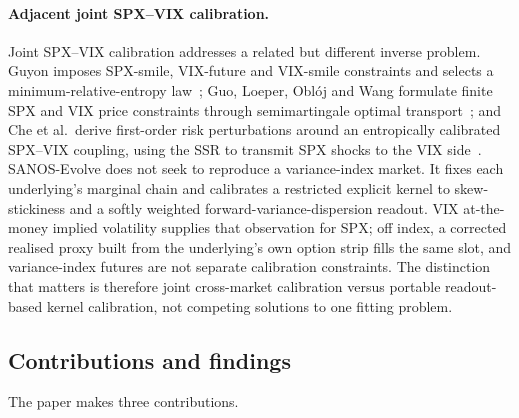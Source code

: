 \documentclass[11pt]{article}
\providecommand{\1}{\mathbf 1}
\begin{document}
\paragraph{Adjacent joint SPX--VIX calibration.} Joint SPX--VIX calibration addresses a related but
different inverse problem. Guyon imposes SPX-smile, VIX-future and VIX-smile constraints and selects
a minimum-relative-entropy law~\cite{guyon2024fs,guyon2025siam}; Guo, Loeper, Obl\'oj and Wang
formulate finite SPX and VIX price constraints through semimartingale optimal
transport~\cite{guo2022siam}; and Che et al.\ derive first-order risk perturbations around an
entropically calibrated SPX--VIX coupling, using the SSR to transmit SPX shocks to the VIX
side~\cite{che2026pot}. SANOS-Evolve does not seek to reproduce a variance-index market. It fixes
each underlying's marginal chain and calibrates a restricted explicit kernel to skew-stickiness and
a softly weighted forward-variance-dispersion readout. VIX at-the-money implied volatility supplies
that observation for SPX; off index, a corrected realised proxy built from the underlying's own
option strip fills the same slot, and variance-index futures are not separate calibration
constraints. The distinction that matters is therefore joint cross-market calibration versus
portable readout-based kernel calibration, not competing solutions to one fitting problem.

\subsection{Contributions and findings}

The paper makes three contributions.
\end{document}
